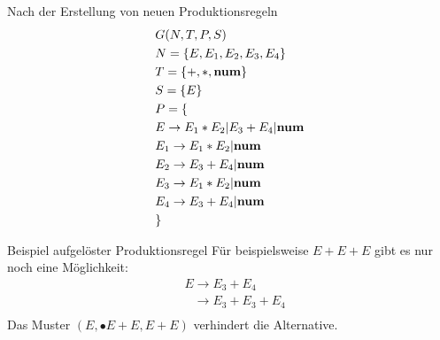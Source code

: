 \documentclass[t]{beamer}
\begin{document}
    \begin{frame}
        \centering
        \begin{minipage}[c]{0.45\textwidth}
            \begin{block}{Nach der Erstellung von neuen Produktionsregeln}
                \vspace{-2em}
                \begin{align*}
                    & G(N,T,P,S) \\
                    & N= \{E, E_1, E_2, E_3, E_4\} \\
                    & T= \{+, *, \bold{num}\} \\
                    & S= \{E\} \\
                    & P = \{ \\
                    & E     \rightarrow E_1 * E_2 | E_3 + E_4 | \bold{num} \\
                    & E_1   \rightarrow E_1 * E_2 | \bold{num} \\
                    & E_2   \rightarrow E_3 + E_4 | \bold{num} \\
                    & E_3   \rightarrow E_1 * E_2 | \bold{num} \\
                    & E_4   \rightarrow E_3 + E_4 | \bold{num} \\
                    & \}
                \end{align*}
            \end{block}
        \end{minipage}%
        \quad\quad%
        \begin{minipage}[c]{0.45\textwidth}
            \vspace{-1em}
            \begin{exampleblock}{Beispiel aufgelöster Produktionsregel}
                Für beispielsweise $E + E + E$ gibt es nur noch eine Möglichkeit:
                \begin{align*}
                    & E \rightarrow E_3 + E_4 \\
                    & \phantom{E} \rightarrow E_3 + E_3 + E_4 \\
                \end{align*}
                Das Muster $(E, \bullet{E}+E, E+E)$ verhindert die Alternative.
            \end{exampleblock}
        \end{minipage}
    \end{frame}
\end{document}
